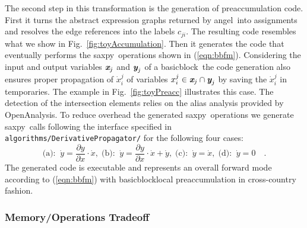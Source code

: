 \documentclass{book}
\newcommand{\angel}{angel}
\newcommand{\basicblock}{basicblock}
\newcommand{\OpenAnalysis}{OpenAnalysis}
\newcommand{\saxpy}{saxpy}
\newcommand{\bmx}{\mbox{\bf\em x}}
\newcommand{\bmy}{\mbox{\bf\em y}}
\newcommand{\code}[1]{{\small\tt{#1}}}
\newcommand{\reffig}[1]{{Fig.~\ref{#1}}}
\newcommand{\refeqn}[1]{{(\ref{#1})}}
\begin{document}
The second step in this transformation is the generation of 
preaccumulation code. 
First it  turns the abstract expression graphs returned by \angel\ 
into assignments and resolves the edge references into 
the  labels $c_{ji}$. The resulting code resembles what 
we show in  \reffig{fig:toyAccumulation}. 
Then it generates the code that eventually performs the \saxpy\ 
operations shown in \refeqn{eqn:bbfm}. 
Considering the input and output variables $\bmx_j$ and $\bmy_j$ of a \basicblock\ the code generation 
also ensures proper propagation of $\dot{x}_i^j$ of variables $ x_i^j \in  \bmx_j \cap \bmy_j$ 
by saving the $\dot{x}_i^j$ in temporaries. The example in \reffig{fig:toyPreacc} illustrates this case. 
The detection of the intersection elements relies on the alias analysis provided by 
\OpenAnalysis.
To reduce overhead 
the generated \saxpy\ operations we generate \saxpy\ calls following the 
interface specified in \code{algorithms/DerivativePropagator/} for the following four cases:
\begin{equation}\label{eqn:fourSaxpy}  
  \mbox{(a):}\;\;\dot{y} = \frac{\partial y }{\partial x }\cdot \dot{x},\; 
  \mbox{(b):}\;\;\dot{y} = \frac{\partial y }{\partial x }\cdot \dot{x} + \dot{y},\; 
  \mbox{(c):}\;\;\dot{y} = \dot{x},\;
  \mbox{(d):}\;\;\dot{y} = 0\quad .
\end{equation}	
The generated code is executable and represents an overall forward mode 
according to \refeqn{eqn:bbfm} with \basicblock\-local preaccumulation in 
cross-country fashion. 

\subsubsection{Memory/Operations Tradeoff}\label{sssec:MMTradeOff}
\end{document}
